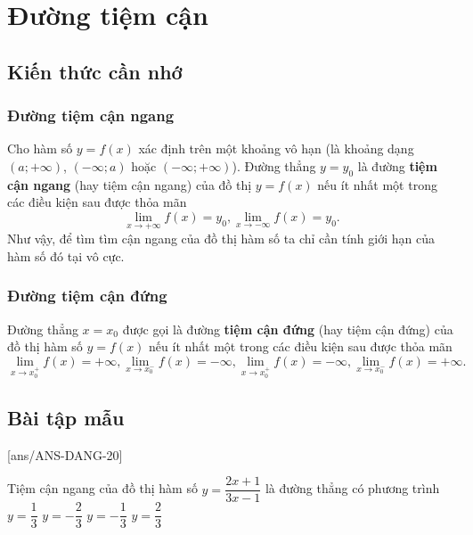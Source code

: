 \setcounter{section}{19}
\setcounter{ex}{0}
\section{Đường tiệm cận}
\subsection{Kiến thức cần nhớ}
\begin{khung}
	\subsubsection{Đường tiệm cận ngang}
		Cho hàm số $y=f(x)$ xác định trên một khoảng vô hạn (là khoảng dạng $(a;+\infty)$, $(-\infty;a)$ hoặc $(-\infty;+\infty)$). Đường thẳng $y=y_0$ là đường \textbf{tiệm cận ngang} (hay tiệm cận ngang) của đồ thị $y=f(x)$ nếu ít nhất một trong các điều kiện sau được thỏa mãn
		\begin{equation*}
			\lim\limits_{x\rightarrow+\infty}f(x)=y_0, \lim\limits_{x\rightarrow-\infty}f(x)=y_0.
		\end{equation*}
	Như vậy, để tìm tìm cận ngang của đồ thị hàm số ta chỉ cần tính giới hạn của hàm số đó tại vô cực.
	\subsubsection{Đường tiệm cận đứng}
		Đường thẳng $x=x_0$ được gọi là đường \textbf{tiệm cận đứng} (hay tiệm cận đứng) của đồ thị hàm số $y=f(x)$ nếu ít nhất một trong các điều kiện sau được thỏa mãn
		\begin{equation*}
			\lim\limits_{x\rightarrow x_0^+}f(x)=+\infty,\lim\limits_{x\rightarrow x_0^-}f(x)=-\infty,\lim\limits_{x\rightarrow x_0^+}f(x)=-\infty,\lim\limits_{x\rightarrow x_0^-}f(x)=+\infty.
		\end{equation*}
\end{khung}
\subsection{Bài tập mẫu}
[ans/ANS-DANG-20]
\begin{khung}
	\begin{vd}%
		Tiệm cận ngang của đồ thị hàm số $y=\dfrac{2x+1}{3x-1}$ là đường thẳng có phương trình
		\choice
		{$y=\dfrac{1}{3}$}	
		{$y=-\dfrac{2}{3}$}
		{$y=-\dfrac{1}{3}$}
		{\True $y=\dfrac{2}{3}$}
	\end{vd}
\end{khung}
